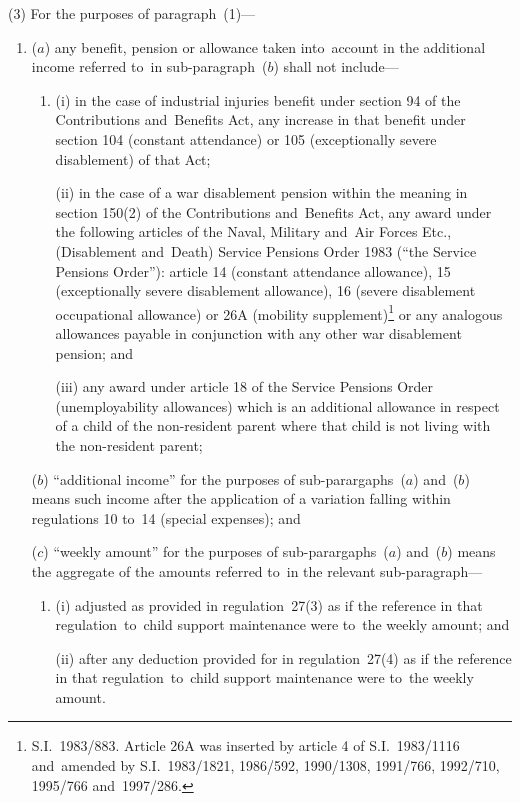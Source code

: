 \documentclass[12pt,a4paper]{article}
\begin{document}
(3) For the purposes of paragraph~(1)—
\begin{enumerate}\item[]
($a$) any benefit, pension or allowance taken into~account in the additional income referred to~in sub-paragraph~($b$)  shall not include—
\begin{enumerate}\item[]
(i) in the case of industrial injuries benefit under section 94 of the Contributions and~Benefits Act, any increase in that benefit under section 104 (constant attendance) or 105 (exceptionally severe disablement) of that Act;

(ii) in the case of a war disablement pension within the meaning in section 150(2) of the Contributions and~Benefits Act, any award under the following articles of the Naval, Military and~Air Forces Etc., (Disablement and~Death) Service Pensions Order 1983 (“the Service Pensions Order”): article 14 (constant attendance allowance), 15 (exceptionally severe disablement allowance), 16 (severe disablement occupational allowance) or 26A (mobility supplement)\footnote{S.I.\ 1983/883. Article 26A was inserted by article 4 of S.I.\ 1983/1116 and~amended by S.I.\ 1983/1821, 1986/592, 1990/1308, 1991/766, 1992/710, 1995/766 and~1997/286.} or any analogous allowances payable in conjunction with any other war disablement pension; and

(iii) any award under article 18 of the Service Pensions Order (unemployability allowances) which is an additional allowance in respect of a child of the non-resident parent where that child is not living with the non-resident parent;
\end{enumerate}

($b$) “additional income” for the purposes of sub-parargaphs~($a$)  and~($b$)  means such income after the application of a variation falling within regulations 10 to~14 (special expenses); and

($c$) “weekly amount” for the purposes of sub-parargaphs~($a$)  and~($b$)  means the aggregate of the amounts referred to~in the relevant sub-paragraph—
\begin{enumerate}\item[]
(i) adjusted as provided in regulation~27(3) as if the reference in that regulation~to~child support maintenance were to~the weekly amount; and

(ii) after any deduction provided for in regulation~27(4) as if the reference in that regulation~to~child support maintenance were to~the weekly amount.
\end{enumerate}
\end{enumerate}
\end{document}
